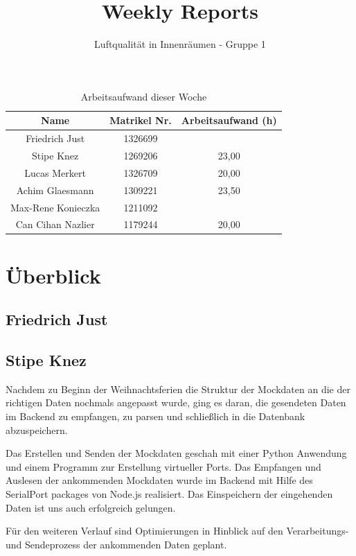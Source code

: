\documentclass[]{article}
\title{Weekly Reports}
\author{Luftqualität in Innenräumen - Gruppe 1}
\begin{document}
\maketitle

\begin{table}[h!]
	\centering
	\begin{tabular}{|c|c|c|}
		\hline
		{\textbf{Name}}				&		{\textbf{Matrikel Nr.}} & {\textbf{Arbeitsaufwand (h)}} \\
		\hline
		Friedrich Just				&		1326699 				&		\\
		\hline
		Stipe Knez				&		1269206 				&	23,00	\\
		\hline
		Lucas Merkert				&		1326709					&	20,00	\\
		\hline
		Achim Glaesmann				&		1309221					&	23,50	\\
		\hline
		Max-Rene Konieczka			&		1211092					&		\\
		\hline
		Can Cihan Nazlier			&		1179244					&	20,00	\\
		\hline
	\end{tabular}
	\caption{Arbeitsaufwand dieser Woche}
	\label{tab:worakload}
\end{table}



\section{Überblick}


\subsection{Friedrich Just}

\subsection{Stipe Knez}
Nachdem zu Beginn der Weihnachtsferien die Struktur der Mockdaten an die der richtigen Daten nochmals angepasst wurde, ging es daran, die gesendeten Daten im Backend zu empfangen, zu parsen und schließlich in die Datenbank abzuspeichern.
 
Das Erstellen und Senden der Mockdaten geschah mit einer Python Anwendung und einem Programm zur Erstellung virtueller Ports. Das Empfangen und Auslesen der ankommenden Mockdaten wurde im Backend mit Hilfe des  SerialPort packages von Node.js realisiert. Das Einspeichern der eingehenden Daten ist uns auch erfolgreich gelungen.

Für den weiteren Verlauf sind Optimierungen in Hinblick auf den Verarbeitungs- und Sendeprozess der ankommenden Daten geplant.
\end{document}
